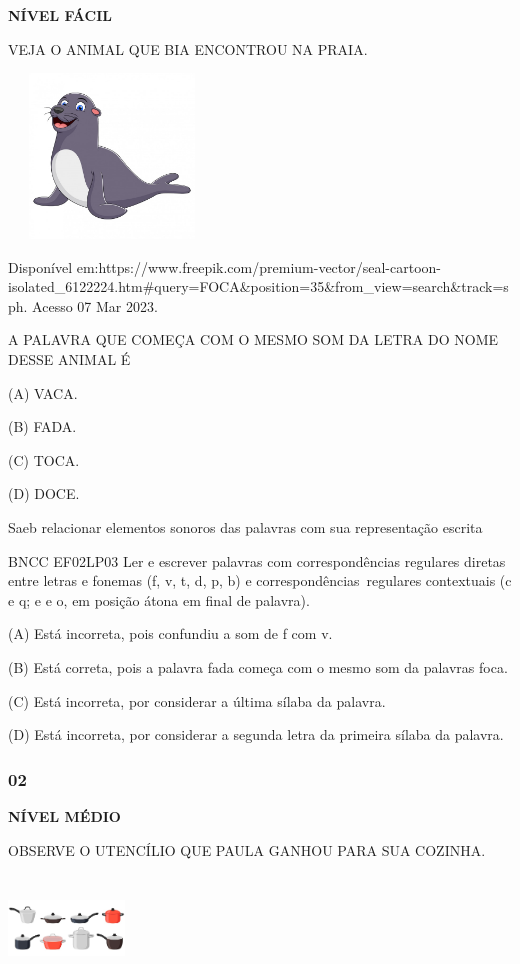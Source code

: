 \textbf{NÍVEL FÁCIL}

VEJA O ANIMAL QUE BIA ENCONTROU NA PRAIA.

\includegraphics[width=2.16528in,height=1.72778in]{media/image139.jpeg}

Disponível
em:https://www.freepik.com/premium-vector/seal-cartoon-isolated\_6122224.htm\#query=FOCA\&position=35\&from\_view=search\&track=sph.
Acesso 07 Mar 2023.

A PALAVRA QUE COMEÇA COM O MESMO SOM DA LETRA DO NOME DESSE ANIMAL É

(A) VACA.

(B) FADA.

(C) TOCA.

(D) DOCE.

Saeb relacionar elementos sonoros das palavras com sua representação
escrita

BNCC EF02LP03 Ler e escrever palavras com correspondências regulares
diretas entre letras e fonemas (f, v, t, d, p, b) e
correspondências~regulares contextuais (c e q; e e o, em posição átona
em final de palavra).

\protect\hypertarget{_Hlk129501253}{}{}(A) Está incorreta, pois
confundiu a som de f com v.

(B) Está correta, pois a palavra fada começa com o mesmo som da palavras
foca.

(C) Está incorreta, por considerar a última sílaba da palavra.

(D) Está incorreta, por considerar a segunda letra da primeira sílaba da
palavra.

\subsubsection{02}\label{section-95}

\textbf{NÍVEL MÉDIO}

OBSERVE O UTENCÍLIO QUE PAULA GANHOU PARA SUA COZINHA.

\includegraphics[width=1.22222in,height=1.11389in]{media/image19.jpeg}

